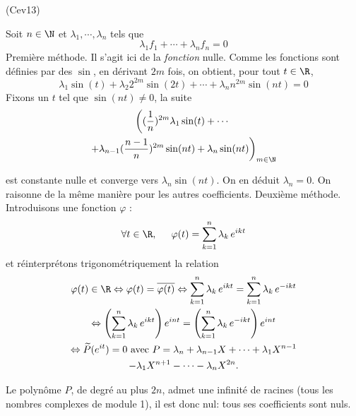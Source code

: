 \begin{tiny}(Cev13)\end{tiny}
Soit $n\in \N$ et $\lambda_1, \cdots, \lambda_n$ tels que
\begin{displaymath}
  \lambda_1 f_1 + \cdots + \lambda_n f_n = 0
\end{displaymath}
Première méthode. Il s'agit ici de la \emph{fonction} nulle. Comme les fonctions sont définies par des $\sin$, en dérivant $2m$ fois, on obtient, pour tout $t\in \R$,
\begin{displaymath}
\lambda_1 \sin(t) + \lambda_2 2^{2m}\sin(2t) + \cdots + \lambda_n n^{2m}\sin(nt) = 0
\end{displaymath}
Fixons un $t$ tel que $\sin(nt)\neq 0$, la suite
\begin{multline*}
  \left((\frac{1}{n})^{2m}\lambda_1 \sin(t) +  \cdots  \right.\\
  \left. +\lambda_{n-1} (\frac{n-1}{n})^{2m}\sin(nt) + \lambda_n\sin(nt) \right)_{m\in \N} 
\end{multline*}

est constante nulle et converge vers $\lambda_n \sin(nt)$. On en déduit $\lambda_n = 0$. On raisonne de la même manière pour les autres coefficients.\newline
Deuxième méthode. Introduisons une fonction $\varphi$ :
\begin{displaymath}
\forall t \in \R,\hspace{0.5cm}  \varphi(t) = \sum_{k=1}^n\lambda_k\,e^{ikt}
\end{displaymath}
et réinterprétons trigonométriquement la relation
\begin{multline*}
\varphi(t)\in \R \Leftrightarrow \varphi(t) = \overline{\varphi(t)}
\Leftrightarrow
\sum_{k=1}^n\lambda_k\,e^{ikt} = \sum_{k=1}^n\lambda_k\,e^{-ikt}\\
\Leftrightarrow
\left( \sum_{k=1}^n\lambda_k\,e^{ikt}\right)e^{int}  = \left( \sum_{k=1}^n\lambda_k\,e^{-ikt}\right) e^{int}\\
\Leftrightarrow
\widetilde{P}(e^{it}) = 0 \text{ avec } 
 P = \lambda_n + \lambda_{n-1}X + \cdots + \lambda_1 X^{n-1}\\
 - \lambda_1 X^{n+1} - \cdots - \lambda_n X^{2n} .
\end{multline*}

Le polynôme $P$, de degré au plus $2n$, admet une infinité de racines (tous les nombres complexes de module 1), il est donc nul: tous ses coefficients sont nuls.
